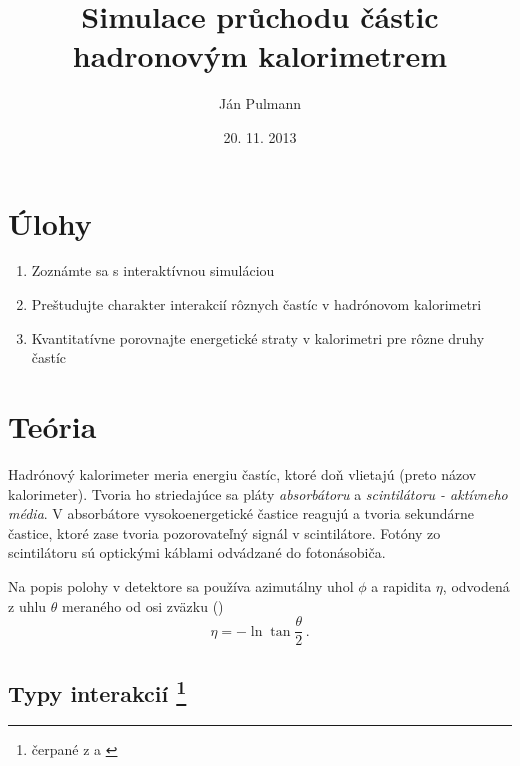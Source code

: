 \documentclass[a4paper, 10pt]{article}
\begin{document}
\title{Simulace průchodu částic hadronovým kalorimetrem}
\author{Ján Pulmann}
\date{20. 11. 2013}
\maketitle
\section*{Úlohy}
\begin{enumerate}

	\item Zoznámte sa s interaktívnou simuláciou
    \item Preštudujte charakter interakcií rôznych častíc v hadrónovom kalorimetri
    \item Kvantitatívne porovnajte energetické straty v kalorimetri pre rôzne druhy častíc
 \end{enumerate}
 
\section*{Teória}
Hadrónový kalorimeter meria energiu častíc, ktoré doň vlietajú (preto názov kalorimeter). Tvoria ho striedajúce sa pláty \textit{absorbátoru} a \textit{scintilátoru - aktívneho média}. V absorbátore vysokoenergetické častice reagujú a tvoria sekundárne častice, ktoré zase tvoria pozorovateľný signál v scintilátore. Fotóny zo scintilátoru sú optickými káblami odvádzané do fotonásobiča.

Na popis polohy v detektore sa používa azimutálny uhol $\phi$ a rapidita $\eta$, odvodená z uhlu $\theta$ meraného od osi zväzku (\cite{stud})
\begin{equation*}
\label{eq:teor:rapidita}
\eta = - \ln \tan \frac \theta 2\,.
\end{equation*}

\subsection*{Typy interakcií \footnote{čerpané z \cite{showers} a \cite{stud}}}
\end{document}
